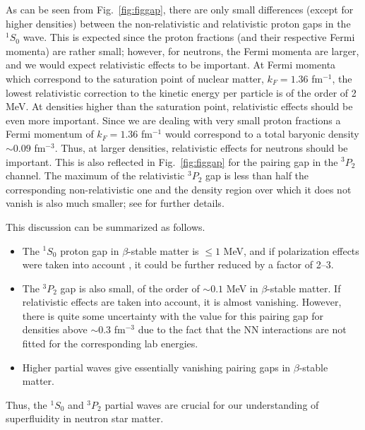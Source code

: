 \documentclass[rmp,preprint,aps,floatfix]{revtex4}
\begin{document}
As can be seen from Fig.\ \ref{fig:figgap}, there are only small
differences (except for higher densities) between the non-relativistic
and relativistic proton gaps in the $^1S_0$ wave.
This is expected since the proton fractions (and their respective Fermi
momenta) are rather small; however,
for neutrons, 
the Fermi momenta are larger, and we would 
expect relativistic effects to be important. At Fermi momenta
which correspond to the
saturation point of nuclear matter, $k_F=1.36$ fm$^{-1}$,
the lowest relativistic correction to the kinetic energy per 
particle is of the order of 2 MeV. 
At densities higher than the saturation
point, relativistic effects should be even 
more important.
Since we are dealing with
very small proton fractions a Fermi momentum
of $k_F=1.36$ fm$^{-1}$ would correspond to a total baryonic 
density $\sim 0.09$  fm$^{-3}$. Thus, at larger densities,
relativistic effects for neutrons should
be important.
This is also reflected in Fig.\ \ref{fig:figgap} for the pairing
gap in the $^3P_2$ channel.
The maximum of the relativistic $^3P_2$ gap is less  than half
the corresponding non-relativistic one and the 
density region over which it does not vanish is also much smaller; 
see  \cite{pair1} for further details.

This discussion  can be summarized as follows.
\begin{itemize}
      \item The $^1S_0$ proton gap in $\beta$-stable matter
            is $ \le 1$ MeV, and if polarization
            effects were taken into account \cite{sclbl96},
            it could be further reduced by a factor of 2--3.
      \item The $^3P_2$ gap is also small, of the order
            of $\sim 0.1$ MeV in $\beta$-stable matter.
            If relativistic effects are taken into account,
            it is almost vanishing. However, there is
            quite some uncertainty with the value for this
            pairing gap for densities above $\sim 0.3$
            fm$^{-3}$ due to the fact that the NN interactions
            are not fitted for the corresponding lab energies. 
      \item Higher partial waves give essentially vanishing
            pairing gaps in $\beta$-stable matter.
\end{itemize}
Thus, the $^1S_0$ and $^3P_2$ partial waves are crucial for our
understanding of superfluidity in neutron star matter. 
\end{document}
